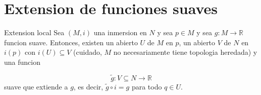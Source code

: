 \section{Extension de funciones suaves}
\begin{bookproposition}{Extension local}
Sea $(M,i)$ una inmersion en $N$ y sea $p\in M$ y sea $g:M\to\mathbb R$ funcion suave. Entonces, existen un abierto $U$ de $M$ en $p$, un abierto $V$ de $N$ en $i(p)$ con $i(U)\subseteq V$ (cuidado, $M$ no necesariamente tiene topologia heredada) y una funcion

\[
\widetilde g:V\subseteq N\to\mathbb R
\]
suave que extiende a $g$, es decir, $\widetilde g\circ i=g$ para todo $q\in U$. 


\end{bookproposition}
